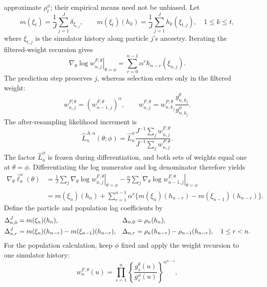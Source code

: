 \documentclass[11pt]{article}
\theoremstyle{thmstylethree}%
\begin{document}
{approximate $\rho_t^\phi$; their empirical means need not be unbiased.
Let
\begin{equation}
m(\xi_t)=\frac1J\sum_{j=1}^J\delta_{\xi_{t,j}},
\qquad m(\xi_t)(h_k)=\frac1J\sum_{j=1}^Jh_k(\xi_{t,j}),
\quad 1\leq k\leq t,
\label{eq:explicit-path-empirical-measure}
\end{equation}
where $\xi_{t,j}$ is the simulator history along particle $j$'s ancestry.
Iterating the filtered-weight recursion gives
\begin{equation}
\left.\nabla_\theta\log w_{n,j}^{F,\theta}\right|_{\theta=\phi}
=\sum_{r=0}^{n-1}\alpha^r h_{n-r}(\xi_{n,j}).
\label{eq:unrolled-filtered-weight}
\end{equation}
The prediction step preserves $j$, whereas selection enters only in the
filtered weight:
\begin{equation}
w_{n,j}^{P,\theta}=(w_{n-1,j}^{F,\theta})^\alpha,
\qquad w_{n,j}^{F,\theta}=w_{n,k_j}^{P,\theta}
\frac{g_{n,k_j}^{\theta}}{g_{n,k_j}^{\phi}}.
\label{eq:filtered-weight-current-resampling-index}
\end{equation}
The after-resampling likelihood increment is
\[
\widehat L_n^{A,\alpha}(\theta;\phi)
=\widehat L_n^\phi
\frac{J^{-1}\sum_jw_{n,j}^{F,\theta}}
     {J^{-1}\sum_jw_{n,j}^{P,\theta}}.
\]
The factor $\widehat L_n^\phi$ is frozen during differentiation, and
both sets of weights equal one at $\theta=\phi$. Differentiating the
log numerator and log denominator therefore yields
\begin{align}
\nabla_\theta\hat\ell_n^\alpha(\theta)
&=\frac1J\sum_j\left.\nabla_\theta\log w_{n,j}^{F,\theta}\right|_{\theta=\phi}
-\frac\alpha J\sum_j\left.\nabla_\theta\log w_{n-1,j}^{F,\theta}\right|_{\theta=\phi}
\label{eq:conditional-score-weight-difference}\\
&=m(\xi_n)(h_n)+\sum_{r=1}^{n-1}\alpha^r
\{m(\xi_n)(h_{n-r})-m(\xi_{n-1})(h_{n-r})\}.
\label{eq:conditional-score-path-decomposition}
\end{align}
Define the particle and population lag coefficients by
\begin{align}
\Delta_{n,0}^J&=m(\xi_n)(h_n),&\Delta_{n,0}&=\rho_n(h_n),\notag\\
\Delta_{n,r}^J&=m(\xi_n)(h_{n-r})-m(\xi_{n-1})(h_{n-r}),&
\Delta_{n,r}&=\rho_n(h_{n-r})-\rho_{n-1}(h_{n-r}),
\quad 1\leq r<n.
\label{eq:lag-coefficient-definitions}
\end{align}
For the population calculation, keep $\phi$ fixed and apply the weight
recursion to one simulator history:
\[
w_n^{F,\theta}(u)
=\prod_{s=1}^n\left\{\frac{g_s^\theta(u)}{g_s^\phi(u)}\right\}^{\alpha^{n-s}},
\]}
\end{document}
